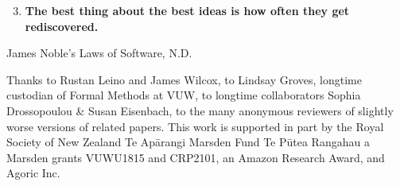 \documentclass[sigplan,review,screen,balance]{acmart}
\begin{document}
\begin{teaserfigure}
\begin{center}
\begin{minipage}{0.8\textwidth}
  {\Large
  \begin{enumerate}
  \setcounter{enumi}{2}
  \item \textbf{The best thing about the best ideas is how often they get rediscovered.}
    \end{enumerate}}
  \begin{flushright}
    James Noble's Laws of Software, N.D. 
  \end{flushright}
  \end{minipage}
  \vspace*{5mm}
\end{center}
\end{teaserfigure}





\maketitle
%
%
%


%




\balance




\begin{acks}
Thanks to Rustan Leino and James Wilcox, 
to Lindsay Groves, longtime custodian of Formal Methods at VUW,
to longtime collaborators Sophia Drossopoulou \& Susan Eisenbach,
to the many anonymous reviewers of slightly worse versions of related papers.
%
%
This work is supported in part by the Royal Society of New Zealand Te Ap\={a}rangi  Marsden Fund Te P\={u}tea Rangahau a Marsden grants VUWU1815 and CRP2101, an Amazon Research Award, and Agoric Inc.
\end{acks}

\pagebreak






%
\end{document}
